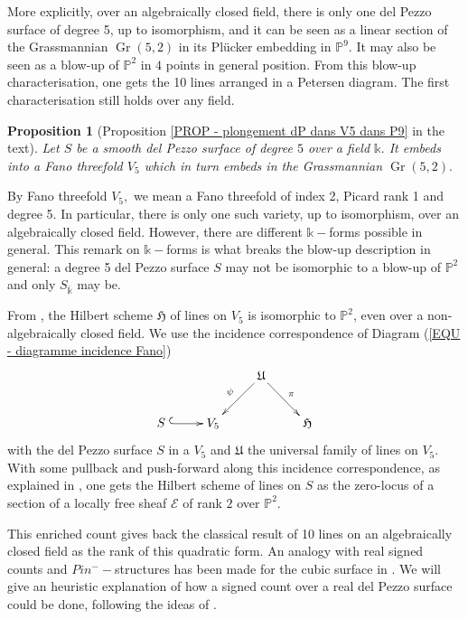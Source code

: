 \documentclass{amsart}
\theoremstyle{plain}%
\newtheorem{propintro}[subsection]{Proposition}
\theoremstyle{remark}
\theoremstyle{definition}
\newcommand{\cE}{\mathcal{E}}
\newcommand{\ek}{\mathbb{k}}
\newcommand{\eP}{\mathbb{P}}
\newcommand{\fH}{\mathfrak{H}}
\newcommand{\fU}{\mathfrak{U}}
\newcommand{\Grass}{\operatorname{Gr}}
\begin{document}
More explicitly, over an algebraically closed field, there is only one del Pezzo surface of degree 5, up to isomorphism, and it can be seen as a linear section of the Grassmannian $\Grass(5,2)$ in its Plücker embedding in $\eP^9.$ It may also be seen as a blow-up of $\eP^2$ in $4$ points in general position. From this blow-up characterisation, one gets the 10 lines arranged in a Petersen diagram. The first characterisation still holds over any field.
\begin{propintro}[Proposition \ref{PROP - plongement dP dans V5 dans P9} in the text]
Let $S$ be a smooth del Pezzo surface of degree $5$ over a field $\ek.$ It embeds into a Fano threefold $V_5$ which in turn embeds in the Grassmannian $\Grass(5,2).$
\end{propintro}
By Fano threefold $V_5,$ we mean a Fano threefold of index 2, Picard rank 1 and degree 5. In particular, there is only one such variety, up to isomorphism, over an algebraically closed field. However, there are different $\ek-$forms possible in general. This remark on $\ek-$forms is what breaks the blow-up description in general: a degree 5 del Pezzo surface $S$ may not be isomorphic to a blow-up of $\eP^2$ and only $S_{\overline{\ek}}$ may be.

From \cite{FN89}, the Hilbert scheme $\fH$ of lines on $V_5$ is isomorphic to $\eP^2$, even over a non-algebraically closed field. We use the incidence correspondence of Diagram (\ref{EQU - diagramme incidence Fano})
\begin{align*}
    \xymatrix{&&\fU\ar[ld]_\psi \ar[rd]^\pi & \\ S \hspace{0.1cm}\ar@{^{(}->}[r] & V_5&&\fH}
\end{align*}
with the del Pezzo surface $S$ in a $V_5$ and $\fU$ the universal family of lines on $V_5.$ With some pullback and push-forward along this incidence correspondence, as explained in \cite{Cha_dP2-4}, one gets the Hilbert scheme of lines on $S$ as the zero-locus of a section of a locally free sheaf $\cE$ of rank $2$ over $\eP^2.$

This enriched count gives back the classical result of 10 lines on an algebraically closed field as the rank of this quadratic form. An analogy with real signed counts and $Pin^- -$structures has been made for the cubic surface in \cite{Kass_Wickelgren}. We will give an heuristic explanation of how a signed count over a real del Pezzo surface could be done, following the ideas of \cite{FK_real-lines}.
\end{document}
